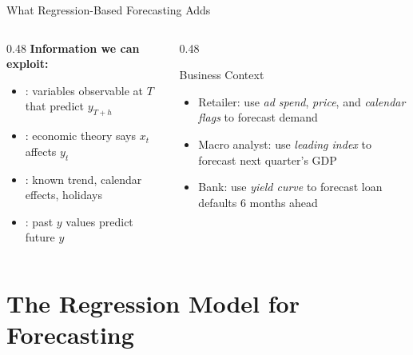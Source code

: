 \documentclass[aspectratio=169, 11pt]{beamer}
\begin{document}
\begin{frame}{What Regression-Based Forecasting Adds}
  \begin{columns}[T]
    \begin{column}{0.48\textwidth}
      \textbf{Information we can exploit:}
      \begin{itemize}
        \item {}: variables observable at $T$
              that predict $y_{T+h}$
        \item {}: economic theory says
              $x_t$ affects $y_t$
        \item {}: known trend, calendar
              effects, holidays
        \item {}: past $y$ values predict future $y$
      \end{itemize}
    \end{column}
    \begin{column}{0.48\textwidth}
      \begin{examplebox}{Business Context}
        \begin{itemize}
          \item Retailer: use \emph{ad spend}, \emph{price}, and
                \emph{calendar flags} to forecast demand
          \item Macro analyst: use \emph{leading index} to forecast
                next quarter's GDP
          \item Bank: use \emph{yield curve} to forecast loan defaults
                6 months ahead
        \end{itemize}
      \end{examplebox}
    \end{column}
  \end{columns}
\end{frame}

\section{The Regression Model for Forecasting}

\end{document}

